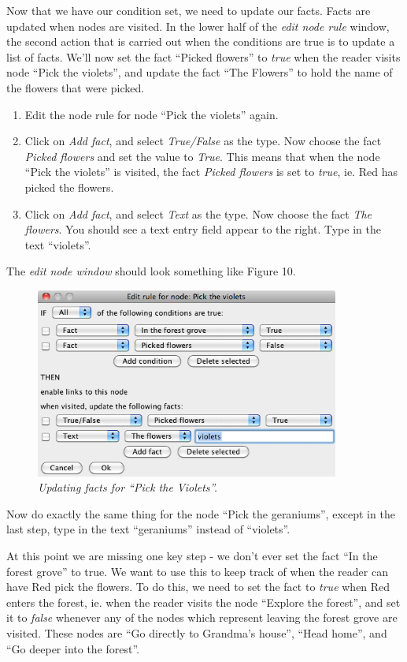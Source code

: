 \documentclass{article}
\begin{document}
Now that we have our condition set, we need to update our facts. Facts are
updated when nodes are visited. In the lower half of the \textit{edit node
rule} window, the second action that is carried out when the conditions are
true is to update a list of facts. We'll now set the fact ``Picked flowers'' to
\textit{true} when the reader visits node ``Pick the violets'', and update the
fact ``The Flowers'' to hold the name of the flowers that were picked.

\begin{enumerate}
  \item Edit the node rule for node ``Pick the violets'' again.
  \item Click on \textit{Add fact}, and select \textit{True/False} as the type.
  Now choose the fact \textit{Picked flowers} and set the value
  to \textit{True}. This means that when the node ``Pick the violets'' is
  visited, the fact \textit{Picked flowers} is set to \textit{true},
  ie. Red has picked the flowers.
  \item Click on \textit{Add fact}, and select \textit{Text} as the type.
  Now choose the fact \textit{The flowers}. You should see a text entry field
  appear to the right. Type in the text ``violets''.
\end{enumerate}

The \textit{edit node window} should look something like Figure 10.

\begin{figure}[h]
  \centering
  \includegraphics[width=10cm]{images/hypedyn-tutorial-3-figure-10}
  \caption{\textit{Updating facts for ``Pick the Violets''.}}
\end{figure}

Now do exactly the same thing for the node ``Pick the geraniums'', except in
the last step, type in the text ``geraniums'' instead of ``violets''.

At this point we are missing one key step - we don't ever set the fact ``In the
forest grove'' to true. We want to use this to keep track of when the reader
can have Red pick the flowers. To do this, we need to set the fact to
\textit{true} when Red enters the forest, ie. when the reader visits the node
``Explore the forest'', and set it to \textit{false} whenever any of the nodes
which represent leaving the forest grove are visited. These nodes are ``Go
directly to Grandma's house'', ``Head home'', and ``Go deeper into the forest''.
\end{document}
